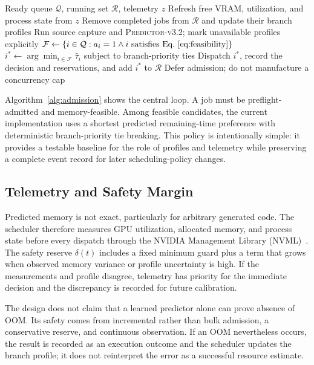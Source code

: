 \documentclass{article}
\newcommand{\predictor}{\textsc{Predictor-v3.2}}
\begin{document}
\begin{algorithm}[t]
\caption{Incremental profile-guided admission}
\label{alg:admission}
\begin{algorithmic}[1]
\Require Ready queue $\mathcal{Q}$, running set $\mathcal{R}$, telemetry $z$
  \State Refresh free VRAM, utilization, and process state from $z$
  \State Remove completed jobs from $\mathcal{R}$ and update their branch profiles
    \State Run source capture and \predictor; mark unavailable profiles explicitly
  \EndFor
  \State $\mathcal{F} \gets \{i\in\mathcal{Q}: a_i=1 \land i\text{ satisfies Eq.~\eqref{eq:feasibility}}\}$
    \State $i^* \gets \arg\min_{i\in\mathcal{F}} \hat{\tau}_i$ subject to branch-priority ties
    \State Dispatch $i^*$, record the decision and reservations, and add $i^*$ to $\mathcal{R}$
  \Else
    \State Defer admission; do not manufacture a concurrency cap
  \EndIf
\EndWhile
\end{algorithmic}
\end{algorithm}

Algorithm~\ref{alg:admission} shows the central loop. A job must be preflight-admitted and memory-feasible. Among feasible candidates, the current implementation uses a shortest predicted remaining-time preference with deterministic branch-priority tie breaking. This policy is intentionally simple: it provides a testable baseline for the role of profiles and telemetry while preserving a complete event record for later scheduling-policy changes.

\subsection{Telemetry and Safety Margin}

Predicted memory is not exact, particularly for arbitrary generated code. The scheduler therefore measures GPU utilization, allocated memory, and process state before every dispatch through the NVIDIA Management Library (NVML)~\cite{nvidia-nvml}. The safety reserve $\delta(t)$ includes a fixed minimum guard plus a term that grows when observed memory variance or profile uncertainty is high. If the measurements and profile disagree, telemetry has priority for the immediate decision and the discrepancy is recorded for future calibration.

The design does not claim that a learned predictor alone can prove absence of OOM. Its safety comes from incremental rather than bulk admission, a conservative reserve, and continuous observation. If an OOM nevertheless occurs, the result is recorded as an execution outcome and the scheduler updates the branch profile; it does not reinterpret the error as a successful resource estimate.
\end{document}
